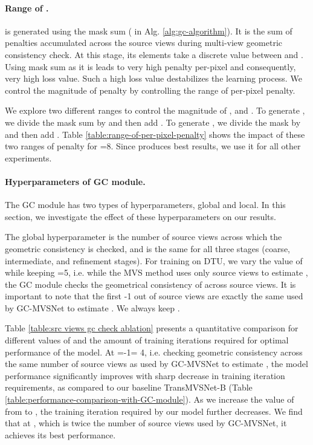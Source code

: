 \documentclass[10pt,twocolumn,letterpaper]{article}
\begin{document}
\vspace{-10pt}
\paragraph{Range of .}
 is generated using the mask sum ( in Alg. \ref{alg:gc-algorithm}). 
It is the sum of penalties accumulated across the  source views during multi-view geometric consistency check. At this stage, its elements take a discrete value between  and . Using mask sum as it is leads to very high penalty
per-pixel and consequently, very high loss value. Such a high loss value 
destabilizes the learning process. We control the magnitude of penalty by controlling the range of per-pixel penalty. 

We explore two different ranges to control the magnitude of ,
 and . To generate , we divide the mask
sum by  and then add . To
generate , we divide the mask by 
and then add . Table
\ref{table:range-of-per-pixel-penalty} shows the impact of these two
ranges of penalty for =8. Since  produces best results,
we use it for all other experiments.


\vspace{-14pt}
\paragraph{Hyperparameters of GC module.}
The GC module has two types of hyperparameters, global and local. In this section,
we investigate the effect of these hyperparameters on our results.

The
global hyperparameter  is the number of source views across which
the geometric consistency is checked, and is the same for all three
stages (coarse, intermediate, and refinement stages).  For training on
DTU, we vary the value of  while keeping =5, i.e. while the MVS
method uses only  source views to estimate , the GC module
checks the geometrical consistency of  across  source
views. It is important to note that the first -1 out of  source
views are exactly the same used by GC-MVSNet to estimate . We
always keep .

Table \ref{table:src views gc check ablation} presents a quantitative
comparison for different values of  and the amount of training
iterations required for optimal performance of the model. At =-1= 4,
i.e. checking geometric consistency across the same number of source
views as used by GC-MVSNet to estimate , the model performance
significantly improves with sharp decrease in training iteration requirements, 
as compared to our baseline TransMVSNet-B (Table
\ref{table:performance-comparison-with-GC-module}). As we increase the
value of  from  to , the training iteration required by our model
further decreases. We find that at , which is twice the number of
source views used by GC-MVSNet, it achieves its best performance.
\end{document}
